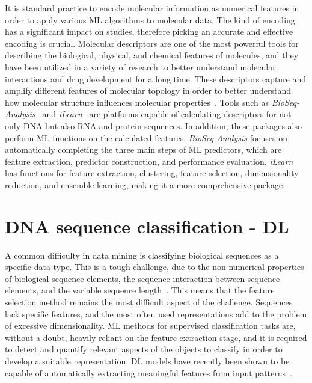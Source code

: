 It is standard practice to encode molecular information as numerical features in order to apply various \gls{ML} algorithms to molecular data. The kind of encoding has a significant impact on studies, therefore picking an accurate and effective encoding is crucial. Molecular descriptors are one of the most powerful tools for describing the biological, physical, and chemical features of molecules, and they have been utilized in a variety of research to better understand molecular interactions and drug development for a long time. These descriptors capture and amplify different features of molecular topology in order to better understand how molecular structure influences molecular properties~\cite{Dong2018PyBioMed:Interactions}. Tools such as
\textit{BioSeq-Analysis}~\cite{Liu2019BioSeq-Analysis:Approaches} and \textit{iLearn}~\cite{Chen2020ILearn:Data} are platforms capable of calculating descriptors for not only \gls{DNA} but also \gls{RNA} and protein sequences. In addition, these packages also perform \gls{ML} functions on the calculated features. \textit{BioSeq-Analysis} focuses on automatically completing the three main steps of \gls{ML} predictors, which are feature extraction, predictor construction, and performance evaluation.
\textit{iLearn} has functions for feature extraction, clustering, feature selection, dimensionality reduction, and ensemble learning, making it a more comprehensive package.


\section{DNA sequence classification - DL}

A common difficulty in data mining is classifying biological sequences as a specific data type. This is a tough challenge, due to the non-numerical properties of biological sequence elements, the sequence interaction between sequence elements, and the variable sequence length~\cite{Yang2020ReviewDNA}. This means that the feature selection method remains the most difficult aspect of the challenge. Sequences lack specific features, and the most often used representations add to the problem of excessive dimensionality. \gls{ML} methods for supervised classification tasks are, without a doubt, heavily reliant on the feature extraction stage, and it is required to detect and quantify relevant aspects of the objects to classify in order to develop a suitable representation. \gls{DL} models have recently been shown to be capable of automatically extracting meaningful features from input patterns~\cite{LoBosco2017DeepClassification}.

